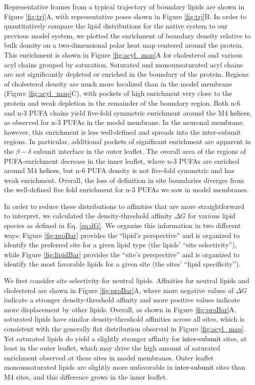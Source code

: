 \documentclass[%
 aip,
 amsmath,amssymb,
 preprint,%
]{revtex4-1}\usepackage{setspace}
\newcommand{\newaffinity}{density-threshold affinity}
\newcommand{\newaffinities}{density-threshold affinities}
\newcommand{\liam}[1]{\textcolor{black}{#1}}
\begin{document}
Representative frames from a typical trajectory of boundary lipids are shown in Figure \ref{fig:trj}A, with representative poses shown in Figure \ref{fig:trj}B.  In order to quantitatively compare the lipid distributions for the native system to our previous model system, we plotted the enrichment of boundary density relative to bulk density on a two-dimensional polar heat map centered around the protein. This enrichment is shown in Figure \ref{fig:acyl_map}A for cholesterol and various acyl chains grouped by  saturation. Saturated and monounsaturated acyl chains are not significantly depleted or enriched in the boundary of the protein. Regions of cholesterol density are much more localized than in the model membrane (Figure \ref{fig:acyl_map}C), with pockets of high enrichment very close to the protein and weak depletion in the remainder of the boundary region.  Both n-6 and n-3 PUFA chains yield five-fold symmetric enrichment around the M4 \liam{helices}, as observed for n-3 PUFAs in the model membrane.  In the neuronal membrane, however, this enrichment is less well-defined and spreads into the inter-subunit regions. In particular, additional pockets of significant enrichment are apparent in the $\beta-\delta$ subunit interface in the outer leaflet. The overall area of the regions of PUFA-enrichment decrease in the inner leaflet, where n-3 PUFAs are enriched around M4 \liam{helices}, but n-6 PUFA density is not five-fold symmetric and has weak enrichment. Overall, the loss of definition in site boundaries diverges from the well-defined five fold enrichment for n-3 PUFAs we saw in model membranes\cite{Woods2019}. 

In order to reduce these distributions to affinities that are more straightforward to interpret, we calculated the \newaffinity{}  $\Delta G$ for various lipid species as defined in Eq. \ref{eq:dG}. We organize this information in two different ways: Figure \ref{fig:proBar} provides the ``lipid's perspective'' and is organized to identify the preferred site for a given lipid type (the lipids' ``site selectivity''), while Figure \ref{fig:lipidBar} provides the ``site's perspective'' and is organized to identify the most favorable lipids for a given site (the sites' ``lipid specificity''). 

We first consider site selectivity for neutral lipids. Affinities for neutral lipids and cholesterol are shown in Figure \ref{fig:proBar}A, where more negative values of $\Delta G$ indicate a stronger \newaffinity{} and more positive values indicate more displacement by other lipids.  Overall, as shown in Figure \ref{fig:proBar}A, saturated lipids have similar \newaffinities{} across all sites, which is consistent with the generally flat distribution observed in Figure \ref{fig:acyl_map}. Yet saturated lipids do yield a slightly stronger affinity for  \liam{inter-subunit} sites, at least in the outer leaflet, which may drive the high amount of saturated enrichment observed at these sites in model membranes.  Outer leaflet monounsaturated lipids are slightly more unfavorable in  \liam{inter-subunit} sites than M4 sites, and this difference grows in the inner leaflet. 
\end{document}
